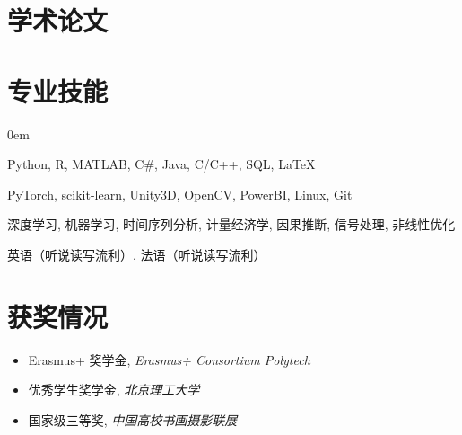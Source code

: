 \documentclass{mycv}
\begin{document}

\vspace{-\parskip}

\section{学术论文}


\vspace{-\parskip}

\section{专业技能}

\begin{description}
  \itemsep 0em
  \item[{\it 编程语言}:] Python, R, MATLAB, C\#, Java, C/C++, SQL, \LaTeX
  \item[{\it 工具与框架}:] PyTorch, scikit-learn, Unity3D, OpenCV, PowerBI, Linux, Git
  \item[{\it 技能专长}:] 深度学习, 机器学习, 时间序列分析, 计量经济学, 因果推断, 信号处理, 非线性优化
  \item[{\it 外语}:] 英语（听说读写流利）, 法语（听说读写流利）
\end{description}

\vspace{-\parskip}

\section{获奖情况}

\begin{itemize}
  \itemsep 0em
  \item Erasmus+ 奖学金, \textit{Erasmus+ Consortium Polytech} 
  \item 优秀学生奖学金, \textit{北京理工大学} 
  \item 国家级三等奖, \textit{中国高校书画摄影联展} 
\end{itemize}
\end{document}
